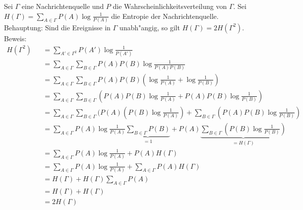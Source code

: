 \documentclass[a4paper]{article}
\def\header#1#2#3#4{\pagestyle{empty}
\noindent
\begin{minipage}[t]{0.6\textwidth}
\begin{flushleft}
\bf \"Ubungen zur Datenkompression\\
WSI f\"ur Informatik\\
Lange/Krebs (Behle)
\end{flushleft}
\end{minipage}
\begin{minipage}[t]{0.4\textwidth}
\begin{flushright}
\bf Sommersemester 2009\\
Universit\"at T\"ubingen\\
#2 %
\end{flushright}
\end{minipage}

\begin{center}
{\Large\bf Blatt #1}

{(Abgabe am #3)}
\end{center}
}
\begin{document}
\noindent
Sei $\Gamma$ eine Nachrichtenquelle und $P$ die Wahrscheinlichkeitsverteilung von $\Gamma$.
Sei $H(\Gamma)=\sum_{A\in\Gamma} P(A)\log \frac 1{P(A)}$ die Entropie der Nachrichtenquelle.\\
Behauptung: Sind die Ereignisse in $\Gamma$ unabh"angig, so gilt $H(\Gamma)=2H(\Gamma^2)$.\\
Beweis:
\begin{eqnarray}
H(\Gamma^2)&&=\sum_{A'\in\Gamma^2} P(A')\log \frac 1{P(A')}\\
&&=\sum_{A\in\Gamma}\sum_{B\in\Gamma} P(A)P(B)\log \frac 1{P(A)P(B)}\\
&&=\sum_{A\in\Gamma}\sum_{B\in\Gamma} P(A)P(B)(\log \frac 1{P(A)}+\log \frac 1{P(B)})\\
&&=\sum_{A\in\Gamma}\sum_{B\in\Gamma} (P(A)P(B)\log \frac 1{P(A)}+P(A)P(B)\log \frac 1{P(B)})\\
&&=\sum_{A\in\Gamma}\sum_{B\in\Gamma} (P(A)(P(B)\log \frac 1{P(A)})+\sum_{B\in\Gamma}(P(A)P(B)\log \frac 1{P(B)})\\
&&=\sum_{A\in\Gamma}P(A)\log \frac 1{P(A)}\underbrace{\sum_{B\in\Gamma} P(B)}_{=1}+P(A)\underbrace{\sum_{B\in\Gamma}(P(B)\log \frac 1{P(B)})}_{=H(\Gamma)}\\
&&=\sum_{A\in\Gamma}P(A)\log \frac 1{P(A)}+P(A)H(\Gamma)\\
&&=\sum_{A\in\Gamma}P(A)\log \frac 1{P(A)}+\sum_{A\in\Gamma}P(A)H(\Gamma)\\
&&=H(\Gamma)+H(\Gamma)\sum_{A\in\Gamma}P(A)\\
&&=H(\Gamma)+H(\Gamma)\\
&&=2H(\Gamma)
\end{eqnarray}
\end{document}
